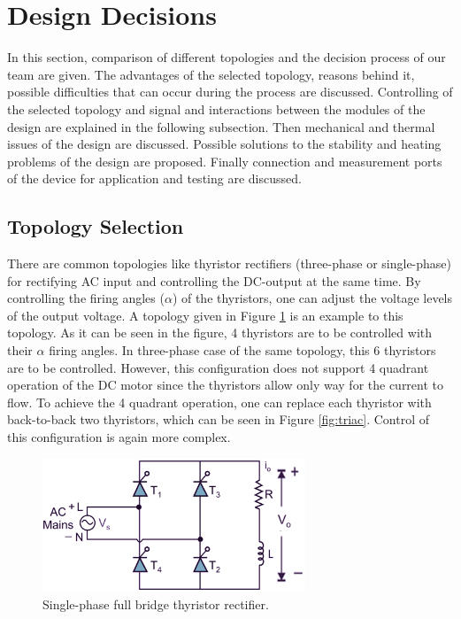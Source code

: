 \section{Design Decisions} \label{design}
In this section, comparison of different topologies and the decision process of our team are given. The advantages of the selected topology, reasons behind it, possible difficulties that can occur during the process are discussed. Controlling of the selected topology and signal and interactions between the modules of the design are explained in the following subsection. Then mechanical and thermal issues of the design are discussed. Possible solutions to the stability and heating problems of the design are proposed. Finally connection and measurement ports of the device for application and testing are discussed. 

\subsection{Topology Selection}

There are common topologies like thyristor rectifiers (three-phase or single-phase) for rectifying AC input and controlling the DC-output at the same time. By controlling the firing angles ($\alpha$) of the thyristors, one can adjust the voltage levels of the output voltage. A topology given in Figure \ref{fig:single_phase_thyristor_fb} is an example to this topology. As it can be seen in the figure, 4 thyristors are to be controlled with their $\alpha$ firing angles. In three-phase case of the same topology, this 6 thyristors are to be controlled. However, this configuration does not support 4 quadrant operation of the DC motor since the thyristors allow only way for the current to flow. To achieve the 4 quadrant operation, one can replace each thyristor with back-to-back two thyristors, which can be seen in Figure \ref{fig:triac}. Control of this configuration is again more complex. \\

\begin{figure}[H]
    \centering
    \includegraphics[width=0.7\textwidth]{Figures/single_phase_full_bridge_thyristor.png}
    \caption{Single-phase full bridge thyristor rectifier.}
    \label{fig:single_phase_thyristor_fb}
\end{figure}

